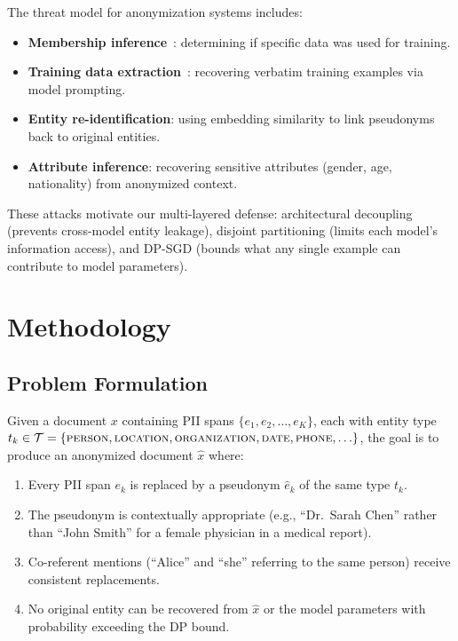 \documentclass[11pt, a4paper]{article}
\begin{document}
The threat model for anonymization systems includes:
\begin{itemize}[leftmargin=*]
  \item \textbf{Membership inference}~\cite{shokri2017membership}:
        determining if specific data was used for training.
  \item \textbf{Training data extraction}~\cite{carlini2021extracting}:
        recovering verbatim training examples via model prompting.
  \item \textbf{Entity re-identification}: using embedding
        similarity to link pseudonyms back to original entities.
  \item \textbf{Attribute inference}: recovering sensitive attributes
        (gender, age, nationality) from anonymized context.
\end{itemize}

These attacks motivate our multi-layered defense: architectural
decoupling (prevents cross-model entity leakage), disjoint partitioning
(limits each model's information access), and DP-SGD (bounds what any
single example can contribute to model parameters).


\section{Methodology}
\label{sec:method}

\subsection{Problem Formulation}

Given a document $x$ containing PII spans
$\{e_1, e_2, \ldots, e_K\}$, each with entity type
$t_k \in \mathcal{T} = \{\textsc{person}, \textsc{location},
\textsc{organization}, \textsc{date}, \textsc{phone}, \ldots\}$,
the goal is to produce an anonymized document $\hat{x}$ where:
\begin{enumerate}[leftmargin=*]
  \item Every PII span $e_k$ is replaced by a pseudonym $\hat{e}_k$
        of the same type $t_k$.
  \item The pseudonym is contextually appropriate (e.g.,
        ``Dr.\ Sarah Chen'' rather than ``John Smith'' for a female
        physician in a medical report).
  \item Co-referent mentions (``Alice'' and ``she'' referring to the
        same person) receive consistent replacements.
  \item No original entity can be recovered from $\hat{x}$ or the
        model parameters with probability exceeding the DP bound.
\end{enumerate}
\end{document}
